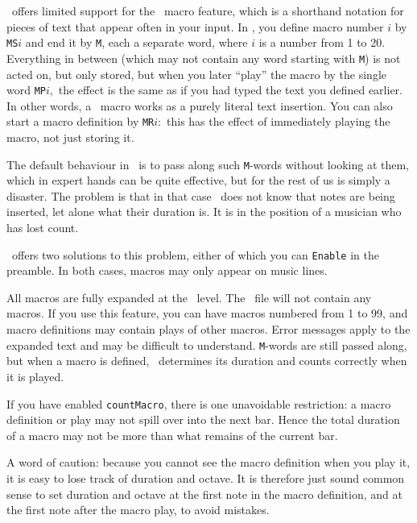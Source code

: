 \documentclass[11pt]{article}
\begin{document}
\MTx\ offers limited support for the \PMX\ macro feature, which is 
a shorthand notation for pieces of text that appear often in your input.
In \PMX, you define macro number $i$ by \texttt{MS}$i$ and end it by \texttt{M},
each a separate word, where $i$ is a number from 1 to 20.  
Everything in between (which may not contain
any word starting with \texttt{M}) is not acted on, but only stored, 
but when you later ``play'' the macro by the single word \texttt{MP}$i,$ 
the effect is the same as if you had typed the text you defined earlier.
In other words, a \PMX\ macro works as a purely literal text insertion.
You can also start a macro definition by \texttt{MR}$i:$ this has the effect
of immediately playing the macro, not just storing it.

The default behaviour in \MTx\ is to pass along such \texttt{M}-words
without looking at them, which in expert hands can be quite effective,
but for the rest of us is simply a disaster.
The problem is that in that case \MTx\ does not know that notes 
are being inserted, let alone what their duration is.  It is in the
position of a musician who has lost count.

\MTx\ offers two solutions to this problem, either of
which you can \texttt{Enable} in the preamble.  In both cases, macros 
may only appear on music lines.
\begin{description}
    All macros are fully expanded at the \MTx\ level.
The \PMX\ file will not contain any macros.  If you use this feature,
you can have macros numbered from 1 to 99, and macro definitions
may contain plays of other macros.  Error messages apply to the expanded
text and may be difficult to understand.
    \texttt{M}-words are still passed along,
but when a macro is defined, \MTx\ determines its duration
and counts correctly when it is played.  
\end{description}

If you have enabled \texttt{countMacro}, there is one unavoidable
restriction:  a macro definition or play may not spill over into
the next bar.   Hence the total duration of a macro may not be more 
than what remains of the current bar.  

A word of caution: because you cannot see the macro 
definition when you play it, it is easy to lose track of duration and octave.  
It is therefore just sound common sense
to set duration and octave at the first note in the macro definition, 
and at the first note after the macro play, to avoid mistakes.
\end{document}
